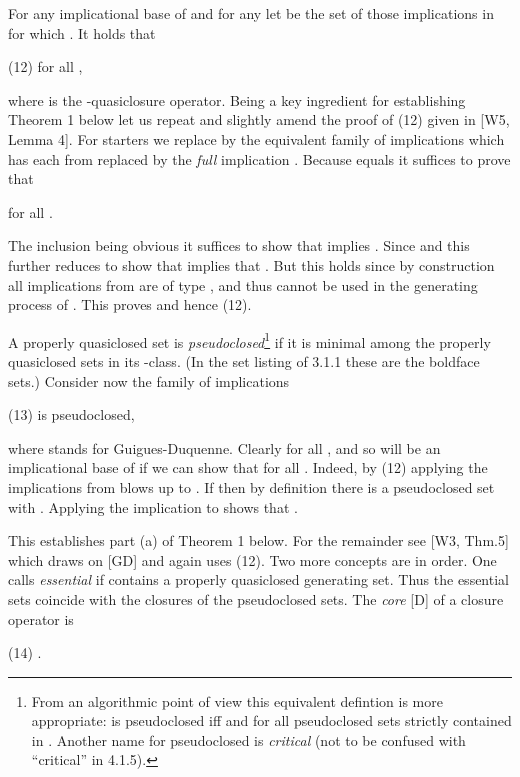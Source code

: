 \documentclass[11pt]{article}
\begin{document}
For any implicational base  of  and for any  let  be the set of those implications   in  for which . It holds that

(12) \quad  \quad for all \quad ,

where  is the -quasiclosure operator. Being a key ingredient for establishing Theorem 1 below let us repeat and slightly amend the proof of (12) given in [W5, Lemma 4]. For starters we replace   by the equivalent family   of  implications which has each  from  replaced by the {\it full} implication . Because  equals  it suffices to prove that

 \quad  for all .

The inclusion  being obvious  it suffices to show that  implies . Since   and  this further reduces to show that  implies that . But this holds since by construction all implications from  are of type , and thus cannot be used in the generating process of . This proves  and hence (12).


A properly quasiclosed set  is {\it pseudoclosed}\footnote{From an algorithmic point of view this equivalent defintion is more appropriate:  is pseudoclosed iff  and  for all pseudoclosed sets  strictly contained in . Another name for pseudoclosed is {\it critical} (not to be confused with ``critical'' in 4.1.5).} if it is minimal among the properly quasiclosed sets in its -class. (In the set listing of 3.1.1 these are the boldface sets.) Consider now the family of implications

(13) \quad  is pseudoclosed,

where  stands for Guigues-Duquenne. Clearly  for all , and so  will be an implicational base of  if we can show that  for all . Indeed, by (12) applying the implications from  blows up  to . If  then by definition there is a pseudoclosed set  with . Applying the implication  to  shows that .

This establishes part (a) of Theorem 1 below. For the remainder see [W3, Thm.5] which draws on [GD] and again uses (12). Two more concepts are in order.
One calls  {\it essential} if  contains a properly quasiclosed generating set. Thus the essential sets coincide with the closures of the pseudoclosed sets.
The {\it core}  [D] of a closure operator  is

(14) \quad .
\end{document}
